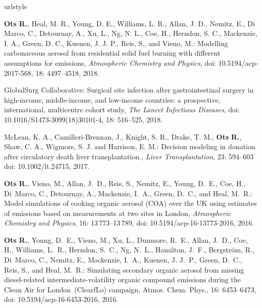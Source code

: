 \documentclass[paper=a4,fontsize=11pt]{scrartcl} %
\begin{document}
\renewcommand{\refname}{JOURNAL PAPERS} 
%
%
\begin{thebibliography}{3}
\providecommand{\natexlab}[1]{#1}
\providecommand{\url}[1]{\texttt{#1}}
\expandafter\ifx\csname urlstyle\endcsname\relax
  \providecommand{\doi}[1]{doi: #1}\else
  \providecommand{\doi}{doi: \begingroup \urlstyle{rm}\Url}\fi
  
  
\textbf{Ots} \textbf{R.}, Heal, M. R., Young, D. E., Williams, L. R., Allan, J. D., Nemitz, E., Di Marco, C., Detournay, A., Xu, L., Ng, N. L., Coe, H., Herndon, S. C., Mackenzie, I. A., Green, D. C., Kuenen, J. J. P., Reis, S., and Vieno, M.: Modelling carbonaceous aerosol from residential solid fuel burning with different assumptions for emissions,
\emph{Atmospheric Chemistry and Physics}, 
\doi{10.5194/acp-2017-568}, 18: 4497--4518, 2018.
 
GlobalSurg Collaborative: Surgical site infection after gastrointestinal surgery in high-income, middle-income, and low-income countries: a prospective, international, multicentre cohort study,
 \emph{The Lancet Infectious Diseases}, 
 \doi{10.1016/S1473-3099(18)30101-4}, 18: 516--525, 2018.
 
McLean, K. A., Camilleri-Brennan, J., Knight, S. R., Drake, T. M., \textbf{Ots} \textbf{R.},  Shaw, C. A., Wigmore, S. J. and Harrison, E. M.: Decision modeling in donation after circulatory death liver transplantation.,
\emph{ Liver Transplantation}, 23: 594--603
\doi{10.1002/lt.24715}, 2017.

  
\textbf{Ots} \textbf{R.}, Vieno, M., Allan, J.~D., Reis, S., Nemitz, E., Young,
D.~E., Coe, H., Di~Marco, C., Detournay, A., Mackenzie, I.~A., Green, D.~C.,
and Heal, M.~R.: Model simulations of cooking organic aerosol (COA) over the
UK using estimates of emissions based on measurements at two sites in London,
\emph{Atmospheric Chemistry and Physics}, 16: 13\,773--13\,789,
\doi{10.5194/acp-16-13773-2016},
2016.

\textbf{Ots} \textbf{R.}, Young, D.~E., Vieno, M., Xu, L., Dunmore, R.~E., Allan,
J.~D., Coe, H., Williams, L.~R., Herndon, S.~C., Ng, N.~L., Hamilton, J.~F.,
Bergstr\"{o}m, R., Di~Marco, C., Nemitz, E., Mackenzie, I.~A., Kuenen, J.
J.~P., Green, D.~C., Reis, S., and Heal, M.~R.: Simulating secondary organic
aerosol from missing diesel-related intermediate-volatility organic compound
emissions during the Clean Air for London~{(ClearfLo)} campaign, Atmos. Chem.
Phys., 16: 6453--6473, \doi{10.5194/acp-16-6453-2016},
2016.



\end{thebibliography}
\end{document}
